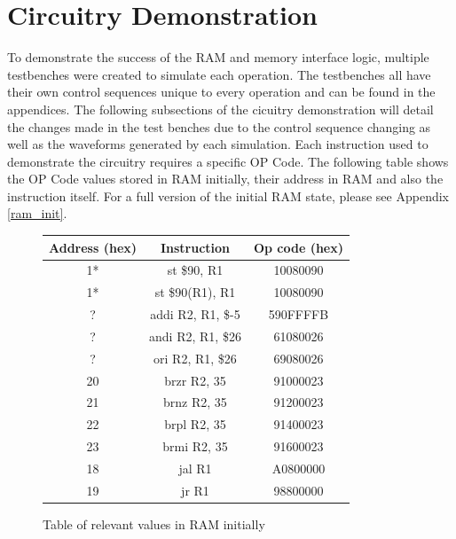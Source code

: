 \documentclass{article}
\begin{document}
\section{Circuitry Demonstration}
    To demonstrate the success of the RAM and memory interface logic, multiple testbenches were created to simulate each operation. 
    The testbenches all have their own control sequences unique to every operation and can be found in the appendices. The following subsections 
    of the cicuitry demonstration will detail the changes made in the test benches due to the control sequence changing as well as the waveforms generated by each simulation.
    Each instruction used to demonstrate the circuitry requires a specific OP Code. The following table shows the OP Code values stored in RAM initially, their address in RAM and also the instruction itself. For a full version of the initial RAM state, please see Appendix \ref{ram_init}.
    \begin{figure}[h!] \label{relevant_ram_init}
        \begin{center}
            \begin{tabular}{|c|c|c|}
                \hline
                Address (hex) & Instruction & Op code (hex) \\
                \hline
                1* & st \$90, R1 & 10080090 \\ %
                \hline
                1* & st \$90(R1), R1 & 10080090 \\ %
                \hline
                ? & addi R2, R1, \$-5 & 590FFFFB \\
                \hline
                ? & andi R2, R1, \$26 & 61080026 \\
                \hline
                ? & ori R2, R1, \$26 & 69080026 \\
                \hline
                20 & brzr R2, 35 & 91000023 \\
                \hline
                21 & brnz R2, 35 & 91200023 \\
                \hline
                22 & brpl R2, 35 & 91400023 \\
                \hline
                23 & brmi R2, 35 & 91600023 \\
                \hline
                18 & jal R1 & A0800000 \\ %
                \hline
                19 & jr R1 & 98800000 \\ %
                \hline
            \end{tabular}
            \caption{Table of relevant values in RAM initially}
        \end{center}
    \end{figure}
\end{document}
